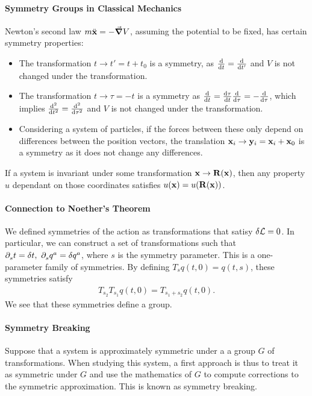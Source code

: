 \paragraph{Symmetry Groups in Classical Mechanics}

Newton's second law $m\ddot{\vb{x}} = -\grad{V}$, assuming the potential to be fixed, has certain symmetry properties:
\begin{itemize}
	\item The transformation $t\to t' = t + t_{0}$ is a symmetry, as $\dv{t} = \dv{t'}$ and $V$ is not changed under the transformation.
	\item The transformation $t\to\tau = -t$ is a symmetry as $\dv{t} = \dv{\tau}{t}\dv{\tau} = -\dv{\tau}$, which implies $\dv[2]{t} = \dv[2]{\tau}$ and $V$ is not changed under the transformation.
	\item Considering a system of particles, if the forces between these only depend on differences between the position vectors, the translation $\vb{x}_{i}\to\vb{y}_{i} = \vb{x}_{i} + \vb{x}_{0}$ is a symmetry as it does not change any differences.
\end{itemize}

If a system is invariant under some transformation $\vb{x}\to\vb{R}(\vb{x})$, then any property $u$ dependant on those coordinates satisfies $u(\vb{x}) = u(\vb{R}(\vb{x}))$.


\paragraph{Connection to Noether's Theorem}
We defined symmetries of the action as transformations that satisy $\delta \mathcal{L} = 0$. In particular, we can construct a set of transformations such that $\partial^{}_{s}t = \delta t,\ \partial^{}_{s}q^{a} = \delta q^{a}$, where $s$ is the symmetry parameter. This is a one-parameter family of symmetries. By defining $T_{s}q(t, 0) = q(t, s)$, these symmetries satisfy
\begin{align*}
T_{s_{2}}T_{s_{1}}q(t, 0) = T_{s_{1} + s_{2}}q(t, 0).
\end{align*}
We see that these symmetries define a group.


\paragraph{Symmetry Breaking}
Suppose that a system is approximately symmetric under a a group $G$ of transformations. When studying this system, a first approach is thus to treat it as symmetric under $G$ and use the mathematics of $G$ to compute corrections to the symmetric approximation. This is known as symmetry breaking.

